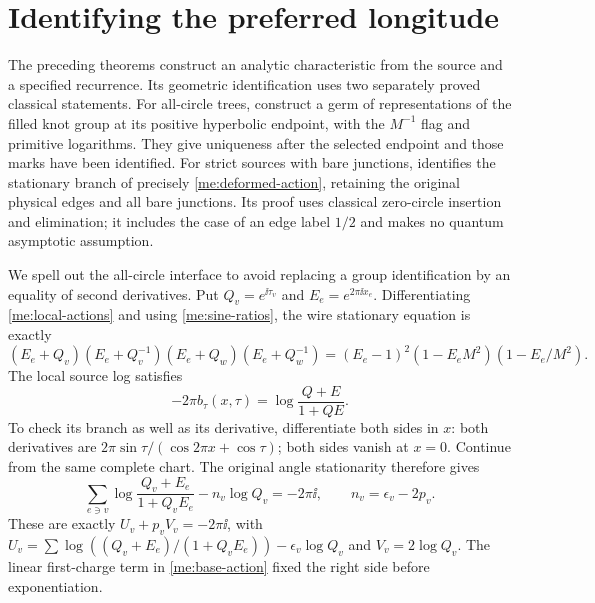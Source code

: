 \section{Identifying the preferred longitude}\label{me:geometric}
The preceding theorems construct an analytic characteristic from
the source and a specified recurrence. Its geometric
identification uses two separately proved classical statements.
For all-circle trees, \cite[Theorem 1.2 and Corollary 7.1]{Nonparabolic}
construct a germ of representations of the filled knot group at its positive
hyperbolic endpoint, with the $M^{-1}$ flag and primitive
logarithms. They give uniqueness after the selected endpoint and
those marks have been identified. For strict sources with bare
junctions, \cite[Theorem 1.3]{Longitudes} identifies the stationary
branch of precisely \eqref{me:deformed-action}, retaining the
original physical edges and all bare junctions. Its proof uses
classical zero-circle insertion and elimination; it includes the
case of an edge label $1/2$ and makes no quantum asymptotic assumption.

We spell out the all-circle interface to avoid replacing a group
identification by an equality of second derivatives. Put
$Q_v=e^{\ii\tau_v}$ and $E_e=e^{2\pi\ii x_e}$. Differentiating
\eqref{me:local-actions} and using \eqref{me:sine-ratios}, the
wire stationary equation is exactly
\begin{equation}\label{me:edge-equation}
 (E_e+Q_v)(E_e+Q_v^{-1})(E_e+Q_w)(E_e+Q_w^{-1})
 =(E_e-1)^2(1-E_eM^2)(1-E_e/M^2).
\end{equation}
The local source log satisfies
\begin{equation}\label{me:angle-log}
 -2\pi b_\tau(x,\tau)=
          \log\frac{Q+E}{1+QE}.
\end{equation}
To check its branch as well as its derivative, differentiate both
sides in $x$: both derivatives are
$2\pi\sin\tau/(\cos2\pi x+\cos\tau)$; both sides vanish at
$x=0$. Continue from the same complete chart. The original angle
stationarity therefore gives
\begin{equation}\label{me:primitive}
 \sum_{e\ni v}\log\frac{Q_v+E_e}{1+Q_vE_e}
       -n_v\log Q_v=-2\pi\ii,
 \qquad n_v=\epsilon_v-2p_v.
\end{equation}
These are exactly $U_v+p_vV_v=-2\pi\ii$, with
$U_v=\sum\log((Q_v+E_e)/(1+Q_vE_e))-\epsilon_v\log Q_v$
and $V_v=2\log Q_v$. The linear first-charge term in
\eqref{me:base-action} fixed the right side before exponentiation.

